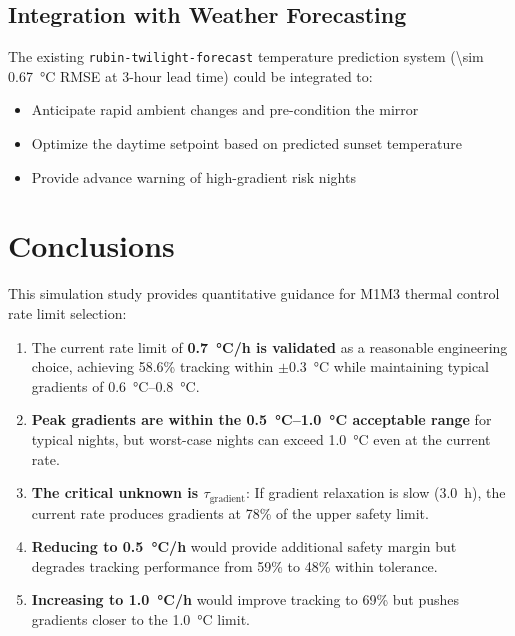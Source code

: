 \documentclass[11pt,a4paper]{article}
\begin{document}
\subsection{Integration with Weather Forecasting}

The existing \texttt{rubin-twilight-forecast} temperature prediction system (\SI{\sim 0.67}{\celsius} RMSE at 3-hour lead time) could be integrated to:
\begin{itemize}
    \item Anticipate rapid ambient changes and pre-condition the mirror
    \item Optimize the daytime setpoint based on predicted sunset temperature
    \item Provide advance warning of high-gradient risk nights
\end{itemize}

\section{Conclusions}

This simulation study provides quantitative guidance for M1M3 thermal control rate limit selection:

\begin{enumerate}
    \item The current rate limit of \textbf{\SI{0.7}{\celsius/h} is validated} as a reasonable engineering choice, achieving 58.6\% tracking within $\pm$\SI{0.3}{\celsius} while maintaining typical gradients of \SI{0.6}{\celsius}--\SI{0.8}{\celsius}.

    \item \textbf{Peak gradients are within the \SI{0.5}{\celsius}--\SI{1.0}{\celsius} acceptable range} for typical nights, but worst-case nights can exceed \SI{1.0}{\celsius} even at the current rate.

    \item \textbf{The critical unknown is $\tau_{\text{gradient}}$}: If gradient relaxation is slow (\SI{3.0}{h}), the current rate produces gradients at 78\% of the upper safety limit.

    \item \textbf{Reducing to \SI{0.5}{\celsius/h}} would provide additional safety margin but degrades tracking performance from 59\% to 48\% within tolerance.

    \item \textbf{Increasing to \SI{1.0}{\celsius/h}} would improve tracking to 69\% but pushes gradients closer to the \SI{1.0}{\celsius} limit.
\end{enumerate}
\end{document}
